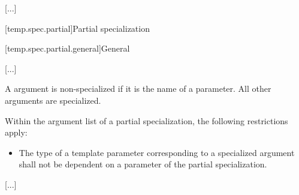 \documentclass{wg21}
\begin{document}
\textcolor{noteclr}{[...]}

[temp.spec.partial]{Partial specialization}

[temp.spec.partial.general]{General}

\textcolor{noteclr}{[...]}

\pnum
A  argument is non-specialized if it is the name of a 
parameter.
All other  arguments are specialized.

\pnum
Within the argument list of a partial specialization,
the following restrictions apply:

\begin{itemize}
    \item
    The type of a template parameter corresponding to a specialized  argument
    shall not be dependent on a parameter of the partial specialization.
\end{itemize}

\textcolor{noteclr}{[...]}
\end{document}
